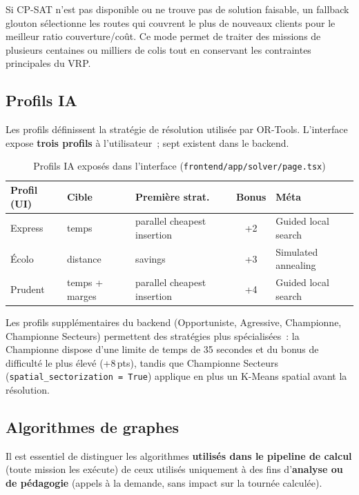 \documentclass[a4paper, 12pt, twoside]{article}
\begin{document}
Si CP-SAT n'est pas disponible ou ne trouve pas de solution faisable, un fallback glouton
s\'{e}lectionne les routes qui couvrent le plus de nouveaux clients pour le meilleur ratio
couverture/co\^{u}t. Ce mode permet de traiter des missions de plusieurs centaines ou
milliers de colis tout en conservant les contraintes principales du VRP.

\subsection{Profils IA}

Les profils d\'{e}finissent la strat\'{e}gie de r\'{e}solution utilis\'{e}e par OR-Tools.
L'interface expose \textbf{trois profils} \`{a} l'utilisateur~; sept existent dans le backend.

\begin{table}[h]
  \begin{center}
    \begin{tabular}{|l|l|l|c|l|}
      \hline
      \textbf{Profil (UI)} & \textbf{Cible} & \textbf{Premi\`{e}re strat.} & \textbf{Bonus} & \textbf{M\'{e}ta} \\
      \hline
      Express & temps & parallel cheapest insertion & +2 & Guided local search \\
      \'{E}colo & distance & savings & +3 & Simulated annealing \\
      Prudent & temps + marges & parallel cheapest insertion & +4 & Guided local search \\
      \hline
    \end{tabular}
  \end{center}
  \caption{Profils IA expos\'{e}s dans l'interface (\texttt{frontend/app/solver/page.tsx})}
  \label{tab:profiles-ui}
\end{table}

Les profils suppl\'{e}mentaires du backend (Opportuniste, Agressive, Championne,
Championne Secteurs) permettent des strat\'{e}gies plus sp\'{e}cialis\'{e}es~: la Championne
dispose d'une limite de temps de 35 secondes et du bonus de difficult\'{e} le plus \'{e}lev\'{e}
(+8\,pts), tandis que Championne Secteurs (\texttt{spatial\_sectorization = True}) applique
en plus un K-Means spatial avant la r\'{e}solution.

\subsection{Algorithmes de graphes}

Il est essentiel de distinguer les algorithmes \textbf{utilis\'{e}s dans le pipeline de calcul}
(toute mission les ex\'{e}cute) de ceux utilis\'{e}s uniquement \`{a} des fins d'\textbf{analyse
ou de p\'{e}dagogie} (appels \`{a} la demande, sans impact sur la tourn\'{e}e calcul\'{e}e).
\end{document}
